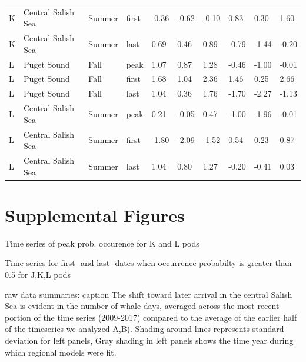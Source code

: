 \documentclass{article}
\begin{document}
\begin{table}[ht]
\begin{tabular}{|p{}|p{}|p{}|p{}|p{}p{}p{}|p{}p{}p{}|}
  K & Central Salish Sea & Summer & first & -0.36 & -0.62 & -0.10 & 0.83 & 0.30 & 1.60 \\ 
  K & Central Salish Sea & Summer & last & 0.69 & 0.46 & 0.89 & -0.79 & -1.44 & -0.20 \\ 
   \hline
L & Puget Sound & Fall & peak & 1.07 & 0.87 & 1.28 & -0.46 & -1.00 & -0.01 \\ 
  L & Puget Sound & Fall & first & 1.68 & 1.04 & 2.36 & 1.46 & 0.25 & 2.66 \\ 
  L & Puget Sound & Fall & last & 1.04 & 0.36 & 1.76 & -1.70 & -2.27 & -1.13 \\ 
  L & Central Salish Sea & Summer & peak & 0.21 & -0.05 & 0.47 & -1.00 & -1.96 & -0.01 \\ 
  L & Central Salish Sea & Summer & first & -1.80 & -2.09 & -1.52 & 0.54 & 0.23 & 0.87 \\ 
  L & Central Salish Sea & Summer & last & 1.04 & 0.80 & 1.27 & -0.20 & -0.41 & 0.03 \\ 
   \hline
\end{tabular}
\endgroup
\end{table}



\section* {Supplemental Figures}
\par Time series of peak prob. occurence for K and L pods
\par Time series for first- and last- dates when occurrence probabilty is greater than 0.5 for J,K,L pods
\par raw data summaries: caption The shift toward later arrival in the central Salish Sea is evident in the number of whale days, averaged across the most recent portion of the time series (2009-2017) compared to the average of the earlier half of the timeseries we analyzed  A,B).  Shading around lines represents standard deviation for left panels, Gray shading in left panels shows the time year during which regional models were fit.
\end{document}

